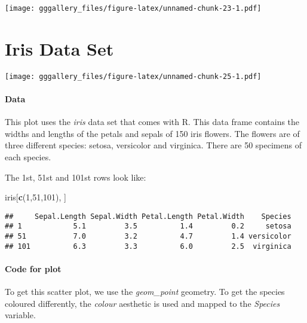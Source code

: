\documentclass[]{book}
\newenvironment{Shaded}{\begin{snugshade}}{\end{snugshade}}
\newcommand{\DecValTok}[1]{\textcolor[rgb]{0.00,0.00,0.81}{#1}}
\newcommand{\KeywordTok}[1]{\textcolor[rgb]{0.13,0.29,0.53}{\textbf{#1}}}
\newcommand{\NormalTok}[1]{#1}
\begin{document}
\texttt{[image: gggallery\_files/figure-latex/unnamed-chunk-23-1.pdf]}

\hypertarget{iris}{%
\chapter*{Iris Data Set}\label{iris}}

\texttt{[image: gggallery\_files/figure-latex/unnamed-chunk-25-1.pdf]}

\hypertarget{irisdata}{%
\subsubsection*{Data}\label{irisdata}}

This plot uses the \emph{iris} data set that comes with R. This data frame contains the widths and lengths of the petals and sepals of 150 iris flowers.
The flowers are of three different species: setosa, versicolor and virginica. There are 50 specimens of each species.

The 1st, 51st and 101st rows look like:

\begin{Shaded}
\begin{Highlighting}[]
\NormalTok{iris[}\KeywordTok{c}\NormalTok{(}\DecValTok{1}\NormalTok{,}\DecValTok{51}\NormalTok{,}\DecValTok{101}\NormalTok{), ]}
\end{Highlighting}
\end{Shaded}

\begin{verbatim}
##     Sepal.Length Sepal.Width Petal.Length Petal.Width    Species
## 1            5.1         3.5          1.4         0.2     setosa
## 51           7.0         3.2          4.7         1.4 versicolor
## 101          6.3         3.3          6.0         2.5  virginica
\end{verbatim}

\hypertarget{iriscode}{%
\subsubsection*{Code for plot}\label{iriscode}}

To get this scatter plot, we use the \emph{geom\_point} geometry. To get the species coloured
differently, the \emph{colour} aesthetic is used and mapped to the \emph{Species} variable.
\end{document}
